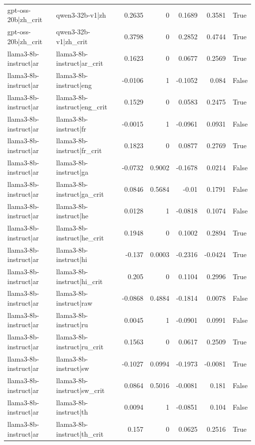 \begin{table}
\begin{tabular}{l l r r r r l}
gpt-oss-20b|zh_crit & qwen3-32b-v1|zh & 0.2635 & 0 & 0.1689 & 0.3581 & True \\
gpt-oss-20b|zh_crit & qwen3-32b-v1|zh_crit & 0.3798 & 0 & 0.2852 & 0.4744 & True \\
llama3-8b-instruct|ar & llama3-8b-instruct|ar_crit & 0.1623 & 0 & 0.0677 & 0.2569 & True \\
llama3-8b-instruct|ar & llama3-8b-instruct|eng & -0.0106 & 1 & -0.1052 & 0.084 & False \\
llama3-8b-instruct|ar & llama3-8b-instruct|eng_crit & 0.1529 & 0 & 0.0583 & 0.2475 & True \\
llama3-8b-instruct|ar & llama3-8b-instruct|fr & -0.0015 & 1 & -0.0961 & 0.0931 & False \\
llama3-8b-instruct|ar & llama3-8b-instruct|fr_crit & 0.1823 & 0 & 0.0877 & 0.2769 & True \\
llama3-8b-instruct|ar & llama3-8b-instruct|ga & -0.0732 & 0.9002 & -0.1678 & 0.0214 & False \\
llama3-8b-instruct|ar & llama3-8b-instruct|ga_crit & 0.0846 & 0.5684 & -0.01 & 0.1791 & False \\
llama3-8b-instruct|ar & llama3-8b-instruct|he & 0.0128 & 1 & -0.0818 & 0.1074 & False \\
llama3-8b-instruct|ar & llama3-8b-instruct|he_crit & 0.1948 & 0 & 0.1002 & 0.2894 & True \\
llama3-8b-instruct|ar & llama3-8b-instruct|hi & -0.137 & 0.0003 & -0.2316 & -0.0424 & True \\
llama3-8b-instruct|ar & llama3-8b-instruct|hi_crit & 0.205 & 0 & 0.1104 & 0.2996 & True \\
llama3-8b-instruct|ar & llama3-8b-instruct|raw & -0.0868 & 0.4884 & -0.1814 & 0.0078 & False \\
llama3-8b-instruct|ar & llama3-8b-instruct|ru & 0.0045 & 1 & -0.0901 & 0.0991 & False \\
llama3-8b-instruct|ar & llama3-8b-instruct|ru_crit & 0.1563 & 0 & 0.0617 & 0.2509 & True \\
llama3-8b-instruct|ar & llama3-8b-instruct|sw & -0.1027 & 0.0994 & -0.1973 & -0.0081 & True \\
llama3-8b-instruct|ar & llama3-8b-instruct|sw_crit & 0.0864 & 0.5016 & -0.0081 & 0.181 & False \\
llama3-8b-instruct|ar & llama3-8b-instruct|th & 0.0094 & 1 & -0.0851 & 0.104 & False \\
llama3-8b-instruct|ar & llama3-8b-instruct|th_crit & 0.157 & 0 & 0.0625 & 0.2516 & True \\

\end{tabular}
\end{table}
